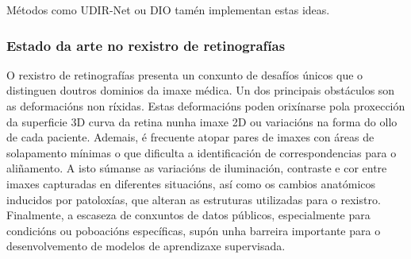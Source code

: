 Métodos como UDIR-Net \cite{undefreg} ou DIO \cite{Jena_2025} tamén implementan estas ideas.




\subsubsection{Estado da arte no rexistro de retinografías}
\label{subsubsec:Estado_da_arte_no_rexistro_de_retinografías}

O rexistro de retinografías presenta un conxunto de desafíos únicos que o distinguen doutros dominios da imaxe médica.
Un dos principais obstáculos son as deformacións non ríxidas. Estas deformacións poden orixínarse pola proxección da superficie 3D curva da retina nunha imaxe 2D ou variacións na forma do ollo de cada paciente. Ademais, é frecuente atopar pares de imaxes con áreas de solapamento mínimas o que dificulta a identificación de correspondencias para o aliñamento. A isto súmanse as variacións de iluminación, contraste e cor entre imaxes capturadas en diferentes situacións, así como os cambios anatómicos inducidos por patoloxías, que alteran as estruturas utilizadas para o rexistro. 
Finalmente, a escaseza de conxuntos de datos públicos, especialmente para condicións ou poboacións específicas, supón unha barreira importante para o desenvolvemento de modelos de aprendizaxe supervisada.    

